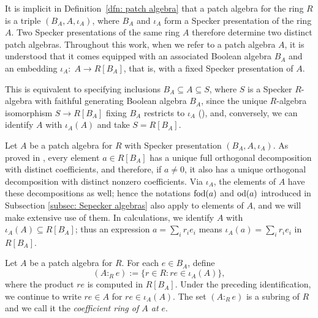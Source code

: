\documentclass[11pt]{amsart}
\begin{document}
\begin{remark}
It is implicit in Definition~\ref{dfn: patch algebra}  that a patch algebra for the ring $R$ is a triple {$(B_A, A, \iota_A)$, where $B_A$ and $\iota_A$ form a Specker presentation of the ring $A$}. Two Specker presentations of the same ring $A$ therefore determine two distinct patch algebras. Throughout this work, when we refer to a patch algebra $A$,  it is understood that it comes equipped with an associated Boolean algebra $B_A$ and {an embedding $\iota_A\colon\; A\to R[B_A]$}, that is, with a fixed Specker presentation of $A$.

This is equivalent to specifying inclusions $B_A\subseteq A\subseteq S$, where $S$ is a Specker $R$-algebra with faithful generating Boolean algebra $B_A$, since the unique $R$-algebra isomorphism $S\to R[B_A]$ fixing $B_A$ restricts to $\iota_A$ (\cite[Theorem~2.7]{BMMO}), and, conversely, we can identify $A$ with $\iota_A(A)$ and take $S=R[B_A]$. 
\end{remark}

\begin{remark}
Let $A$ be a patch algebra for $R$ with Specker presentation {$(B_A,A,\iota_A)$}. As proved in \cite[Lemma 2.1]{BMMO}, every element  $a \in R[B_A]$ has a unique full orthogonal decomposition with distinct coefficients, and therefore, if $a \neq 0$, it also has a unique orthogonal decomposition with distinct nonzero coefficients. Via $\iota_A$, the elements of $A$ have these decompositions as well; hence the notations $\mbox{\rm fod}(a)$ and $\mbox{\rm od}(a)$ introduced in Subsection \ref{subsec: Sepecker algebras} also apply to elements of $A$, and we will make extensive use of them. In calculations, we identify $A$ with $\iota_A(A)\subseteq R[B_A]$; thus an expression $a=\sum_i r_ie_i$ means $\iota_A(a)=\sum_i r_ie_i$ in $R[B_A]$.
\end{remark}


\begin{definition} Let $A$ be a patch algebra for $R$. 
For each $e \in B_A$, define
    $$(A:_R e):=\{r\in R : re\in {\iota_A(A)}\},$$
where the product $re$ is computed in $R[B_A]$. Under the preceding identification, we continue to write $re\in A$ for $re\in\iota_A(A)$. The set $(A:_R e)$ is a subring of $R$
and we call it the {\it coefficient ring of $A$ at $e$}.
\end{definition} 
\end{document}
